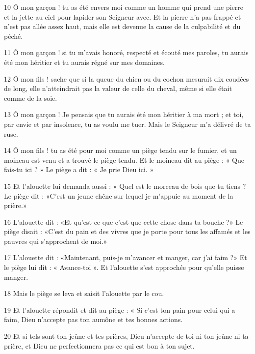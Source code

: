 \par 10 Ô mon garçon ! tu as été envers moi comme un homme qui prend une pierre et la jette au ciel pour lapider son Seigneur avec. Et la pierre n’a pas frappé et n’est pas allée assez haut, mais elle est devenue la cause de la culpabilité et du péché.

\par 11 Ô mon garçon ! si tu m'avais honoré, respecté et écouté mes paroles, tu aurais été mon héritier et tu aurais régné sur mes domaines.

\par 12 Ô mon fils ! sache que si la queue du chien ou du cochon mesurait dix coudées de long, elle n'atteindrait pas la valeur de celle du cheval, même si elle était comme de la soie.

\par 13 Ô mon garçon ! Je pensais que tu aurais été mon héritier à ma mort ; et toi, par envie et par insolence, tu as voulu me tuer. Mais le Seigneur m'a délivré de ta ruse.

\par 14 Ô mon fils ! tu as été pour moi comme un piège tendu sur le fumier, et un moineau est venu et a trouvé le piège tendu. Et le moineau dit au piège : « Que fais-tu ici ? » Le piège a dit : « Je prie Dieu ici. »

\par 15 Et l'alouette lui demanda aussi : « Quel est le morceau de bois que tu tiens ? Le piège dit : «C'est un jeune chêne sur lequel je m'appuie au moment de la prière.»

\par 16 L'alouette dit : «Et qu'est-ce que c'est que cette chose dans ta bouche ?» Le piège disait : «C'est du pain et des vivres que je porte pour tous les affamés et les pauvres qui s'approchent de moi.»

\par 17 L'alouette dit : «Maintenant, puis-je m'avancer et manger, car j'ai faim ?» Et le piège lui dit : « Avance-toi ». Et l'alouette s'est approchée pour qu'elle puisse manger.

\par 18 Mais le piège se leva et saisit l'alouette par le cou.

\par 19 Et l'alouette répondit et dit au piège : « Si c'est ton pain pour celui qui a faim, Dieu n'accepte pas ton aumône et tes bonnes actions.

\par 20 Et si tels sont ton jeûne et tes prières, Dieu n'accepte de toi ni ton jeûne ni ta prière, et Dieu ne perfectionnera pas ce qui est bon à ton sujet.

